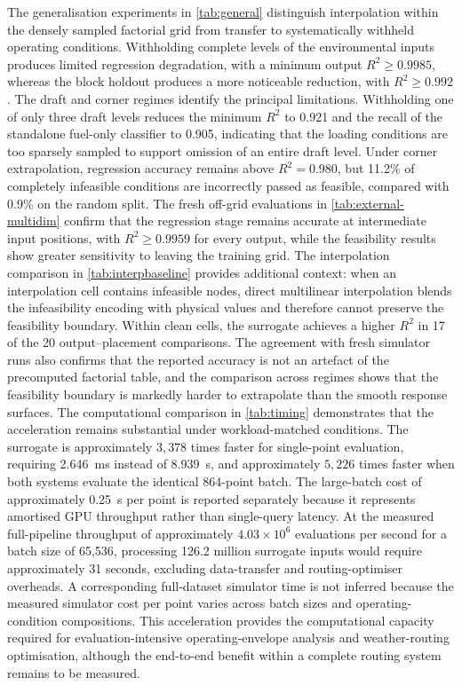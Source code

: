 \documentclass[final,5p,times,twocolumn,numbers]{elsarticle}
\begin{document}
The generalisation experiments in \autoref{tab:general} distinguish interpolation within the densely sampled factorial grid from transfer to systematically withheld operating conditions. Withholding complete levels of the environmental inputs produces limited regression degradation, with a minimum output $R^2\geq0.9985$, whereas the block holdout produces a more noticeable reduction, with $R^2\geq0.992$. The draft and corner regimes identify the principal limitations. Withholding one of only three draft levels reduces the minimum $R^2$ to 0.921 and the recall of the standalone fuel-only classifier to 0.905, indicating that the loading conditions are too sparsely sampled to support omission of an entire draft level. Under corner extrapolation, regression accuracy remains above $R^2=0.980$, but 11.2\% of completely infeasible conditions are incorrectly passed as feasible, compared with 0.9\% on the random split. The fresh off-grid evaluations in \autoref{tab:external-multidim} confirm that the regression stage remains accurate at intermediate input positions, with $R^2\geq0.9959$ for every output, while the feasibility results show greater sensitivity to leaving the training grid. The interpolation comparison in \autoref{tab:interpbaseline} provides additional context: when an interpolation cell contains infeasible nodes, direct multilinear interpolation blends the infeasibility encoding with physical values and therefore cannot preserve the feasibility boundary. Within clean cells, the surrogate achieves a higher $R^2$ in 17 of the 20 output--placement comparisons. The agreement with fresh simulator runs also confirms that the reported accuracy is not an artefact of the precomputed factorial table, and the comparison across regimes shows that the feasibility boundary is markedly harder to extrapolate than the smooth response surfaces.
The computational comparison in \autoref{tab:timing} demonstrates that the acceleration remains substantial under workload-matched conditions. The surrogate is approximately $3{,}378$ times faster for single-point evaluation, requiring 2.646~ms instead of 8.939~s, and approximately $5{,}226$ times faster when both systems evaluate the identical 864-point batch. The large-batch cost of approximately 0.25~\textmu s per point is reported separately because it represents amortised GPU throughput rather than single-query latency. At the measured full-pipeline throughput of approximately $4.03\times10^6$ evaluations per second for a batch size of 65{,}536, processing 126.2 million surrogate inputs would require approximately 31 seconds, excluding data-transfer and routing-optimiser overheads. A corresponding full-dataset simulator time is not inferred because the measured simulator cost per point varies across batch sizes and operating-condition compositions. This acceleration provides the computational capacity required for evaluation-intensive operating-envelope analysis and weather-routing optimisation, although the end-to-end benefit within a complete routing system remains to be measured.
\end{document}
